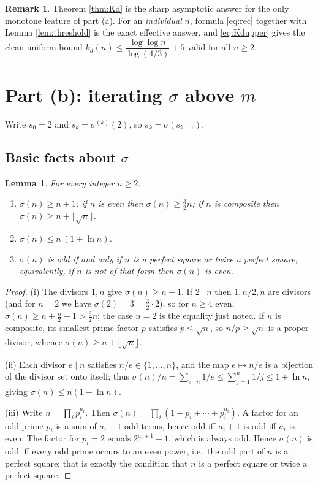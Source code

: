 \documentclass{amsart}
\newtheorem{lemma}{Lemma}
\theoremstyle{definition}
\newtheorem{remark}{Remark}
\begin{document}
\begin{remark}
Theorem \ref{thm:Kd} is the sharp asymptotic answer for the only monotone
feature of part (a). For an \emph{individual} $n$, formula \eqref{eq:rec}
together with Lemma \ref{lem:threshold} is the exact effective answer, and
\eqref{eq:Kdupper} gives the clean uniform bound
$k_d(n)\le \dfrac{\log\log n}{\log(4/3)}+5$ valid for all $n\ge2$.
\end{remark}

\section{Part (b): iterating $\sigma$ above $m$}

Write $s_0=2$ and $s_k=\sigma^{(k)}(2)$, so $s_k=\sigma(s_{k-1})$.

\subsection{Basic facts about $\sigma$}

\begin{lemma}\label{lem:sfacts}
For every integer $n\ge 2$:
\begin{enumerate}
\item[(i)] $\sigma(n)\ge n+1$; if $n$ is even then $\sigma(n)\ge \tfrac32 n$;
if $n$ is composite then $\sigma(n)\ge n+\lfloor\sqrt n\rfloor$.
\item[(ii)] $\sigma(n)\le n\,(1+\ln n)$.
\item[(iii)] $\sigma(n)$ is odd if and only if $n$ is a perfect square or
twice a perfect square; equivalently, if $n$ is \emph{not} of that form then
$\sigma(n)$ is even.
\end{enumerate}
\end{lemma}

\begin{proof}
(i) The divisors $1,n$ give $\sigma(n)\ge n+1$. If $2\mid n$ then $1,n/2,n$ are
divisors (and for $n=2$ we have $\sigma(2)=3=\tfrac32\cdot2$), so for $n\ge4$
even, $\sigma(n)\ge n+\tfrac n2+1>\tfrac32 n$; the case $n=2$ is the equality
just noted. If $n$ is composite, its smallest prime factor $p$ satisfies
$p\le\sqrt n$, so $n/p\ge\sqrt n$ is a proper divisor, whence
$\sigma(n)\ge n+\lfloor\sqrt n\rfloor$.

(ii) Each divisor $e\mid n$ satisfies $n/e\in\{1,\dots,n\}$, and the map
$e\mapsto n/e$ is a bijection of the divisor set onto itself; thus
$\sigma(n)/n=\sum_{e\mid n}1/e\le\sum_{j=1}^{n}1/j\le 1+\ln n$, giving
$\sigma(n)\le n(1+\ln n)$.

(iii) Write $n=\prod_i p_i^{a_i}$. Then
$\sigma(n)=\prod_i(1+p_i+\cdots+p_i^{a_i})$. A factor for an odd prime $p_i$
is a sum of $a_i+1$ odd terms, hence odd iff $a_i+1$ is odd iff $a_i$ is even.
The factor for $p_i=2$ equals $2^{a_i+1}-1$, which is always odd. Hence
$\sigma(n)$ is odd iff every odd prime occurs to an even power, i.e.\ the odd
part of $n$ is a perfect square; that is exactly the condition that $n$ is a
perfect square or twice a perfect square.
\end{proof}
\end{document}
